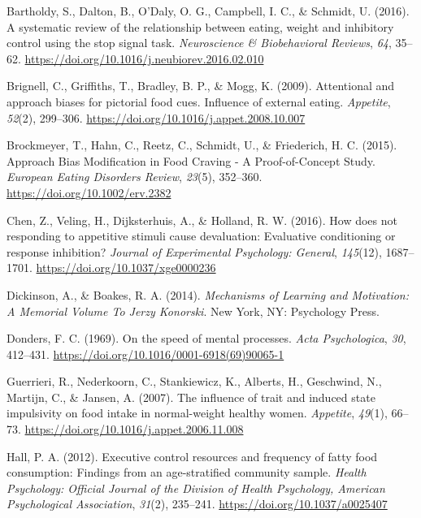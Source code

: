 \documentclass[man]{apa6}
\begin{document}
\leavevmode\hypertarget{ref-bartholdySystematicReviewRelationship2016}{}%
Bartholdy, S., Dalton, B., O'Daly, O. G., Campbell, I. C., \& Schmidt, U. (2016). A systematic review of the relationship between eating, weight and inhibitory control using the stop signal task. \emph{Neuroscience \& Biobehavioral Reviews}, \emph{64}, 35--62. \url{https://doi.org/10.1016/j.neubiorev.2016.02.010}

\leavevmode\hypertarget{ref-brignell_attentional_2009}{}%
Brignell, C., Griffiths, T., Bradley, B. P., \& Mogg, K. (2009). Attentional and approach biases for pictorial food cues. Influence of external eating. \emph{Appetite}, \emph{52}(2), 299--306. \url{https://doi.org/10.1016/j.appet.2008.10.007}

\leavevmode\hypertarget{ref-brockmeyer_approach_2015-1}{}%
Brockmeyer, T., Hahn, C., Reetz, C., Schmidt, U., \& Friederich, H. C. (2015). Approach Bias Modification in Food Craving - A Proof-of-Concept Study. \emph{European Eating Disorders Review}, \emph{23}(5), 352--360. \url{https://doi.org/10.1002/erv.2382}

\leavevmode\hypertarget{ref-chen_how_2016}{}%
Chen, Z., Veling, H., Dijksterhuis, A., \& Holland, R. W. (2016). How does not responding to appetitive stimuli cause devaluation: Evaluative conditioning or response inhibition? \emph{Journal of Experimental Psychology: General}, \emph{145}(12), 1687--1701. \url{https://doi.org/10.1037/xge0000236}

\leavevmode\hypertarget{ref-dickinson_mechanisms_2014}{}%
Dickinson, A., \& Boakes, R. A. (2014). \emph{Mechanisms of Learning and Motivation: A Memorial Volume To Jerzy Konorski}. New York, NY: Psychology Press.

\leavevmode\hypertarget{ref-dondersSpeedMentalProcesses1969}{}%
Donders, F. C. (1969). On the speed of mental processes. \emph{Acta Psychologica}, \emph{30}, 412--431. \url{https://doi.org/10.1016/0001-6918(69)90065-1}

\leavevmode\hypertarget{ref-guerrieri_influence_2007}{}%
Guerrieri, R., Nederkoorn, C., Stankiewicz, K., Alberts, H., Geschwind, N., Martijn, C., \& Jansen, A. (2007). The influence of trait and induced state impulsivity on food intake in normal-weight healthy women. \emph{Appetite}, \emph{49}(1), 66--73. \url{https://doi.org/10.1016/j.appet.2006.11.008}

\leavevmode\hypertarget{ref-hall_executive_2012}{}%
Hall, P. A. (2012). Executive control resources and frequency of fatty food consumption: Findings from an age-stratified community sample. \emph{Health Psychology: Official Journal of the Division of Health Psychology, American Psychological Association}, \emph{31}(2), 235--241. \url{https://doi.org/10.1037/a0025407}
\end{document}

